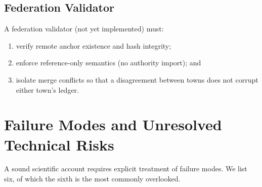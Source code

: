 \documentclass[11pt,a4paper]{article}
\theoremstyle{plain}
\theoremstyle{definition}
\theoremstyle{remark}
\begin{document}
\subsection{Federation Validator}

A federation validator (not yet implemented) must:
\begin{enumerate}[nosep]
  \item verify remote anchor existence and hash integrity;
  \item enforce reference-only semantics (no authority import); and
  \item isolate merge conflicts so that a disagreement between towns
        does not corrupt either town's ledger.
\end{enumerate}

\section{Failure Modes and Unresolved Technical Risks}
\label{sec:failures}

A sound scientific account requires explicit treatment of failure modes.
We list six, of which the sixth is the most commonly overlooked.
\end{document}
